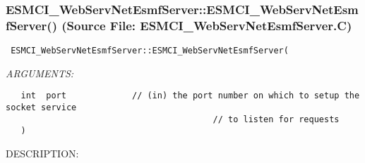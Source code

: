  
\setlength{\oldparskip}{\parskip}
\setlength{\parskip}{1.5ex}
\setlength{\oldparindent}{\parindent}
\setlength{\parindent}{0pt}
\setlength{\oldbaselineskip}{\baselineskip}
\setlength{\baselineskip}{11pt}
 
\def\bv{\begin{verbatim}}
\def\ev{\end{verbatim}}
\def\be{\begin{equation}}
\def\ee{\end{equation}}
\def\bea{\begin{eqnarray}}
\def\eea{\end{eqnarray}}
\def\bi{\begin{itemize}}
\def\ei{\end{itemize}}
\def\bn{\begin{enumerate}}
\def\en{\end{enumerate}}
\def\bd{\begin{description}}
\def\ed{\end{description}}
\def\({\left (}
\def\){\right )}
\def\[{\left [}
\def\]{\right ]}
\def\<{\left  \langle}
\def\>{\right \rangle}
\def\cI{{\cal I}}
\def\diag{\mathop{\rm diag}}
\def\tr{\mathop{\rm tr}}


 
\subsubsection{ESMCI\_WebServNetEsmfServer::ESMCI\_WebServNetEsmfServer() (Source File: ESMCI\_WebServNetEsmfServer.C)}


  
\begin{verbatim} ESMCI_WebServNetEsmfServer::ESMCI_WebServNetEsmfServer(\end{verbatim}{\em ARGUMENTS:}
\begin{verbatim}   int  port             // (in) the port number on which to setup the socket service
                                         // to listen for requests
   )\end{verbatim}
{\sf DESCRIPTION:\\ }


